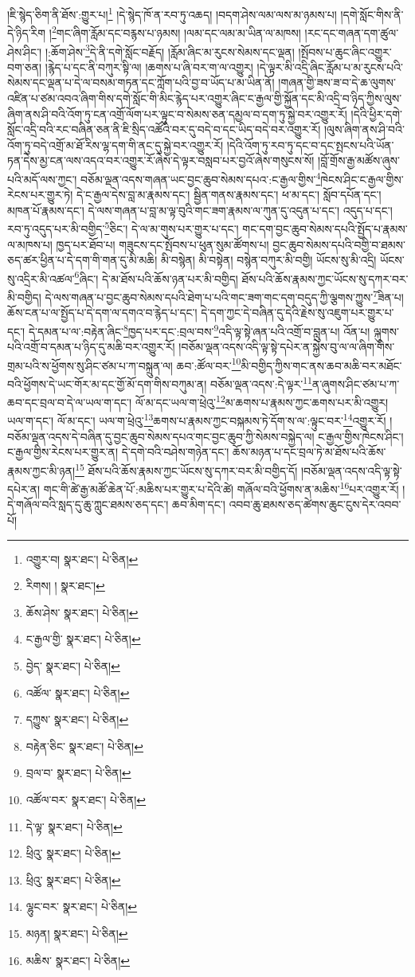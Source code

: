 །ཇི་སྙེད་ཅིག་ནི་ཐོས་:གྱུར་པ།\footnote{འགྱུར་བ།  སྣར་ཐང་།  པེ་ཅིན། } །དེ་སྙེད་ཁོ་ན་རབ་ཏུ་འཆད། །བདག་ཤེས་ལམ་ལས་མ་ཉམས་པ། །དགེ་སློང་གིས་ནི་དེ་ཉིད་རིག །\footnote{རིགས། །  སྣར་ཐང་། }གང་ཞིག་རློམ་དང་བརྙས་པ་ཉམས། །ལམ་དང་ལམ་མ་ཡིན་ལ་མཁས། །རང་དང་གཞན་དག་ཚུལ་ཤེས་ཤིང་། །:ཆོག་ཤེས་\footnote{ཆོས་ཤེས་  སྣར་ཐང་།  པེ་ཅིན། }དེ་ནི་དགེ་སློང་བརྗོད། །རློམ་ཞིང་མ་རུངས་སེམས་དང་ལྡན། །སྤོབས་པ་ཆུང་ཞིང་འགྱུར་བག་ཅན། །རྙེད་པ་དང་ནི་བཀུར་སྟི་ལ། །ཆགས་པ་ཞི་བར་ག་ལ་འགྱུར། །དེ་ལྟར་མི་འདྲི་ཞིང་རློམ་པ་མ་རུངས་པའི་སེམས་དང་ལྡན་པ་དེ་ལ་བསམ་གཏན་དང་ཀློག་པའི་བྱ་བ་ཡོད་པ་མ་ཡིན་ནོ། །གཞན་གྱི་ཟས་ཟ་བ་དེ་ཆ་ལུགས་འཛིན་པ་ཙམ་འབའ་ཞིག་གིས་དགེ་སློང་གི་མིང་རྙེད་པར་འགྱུར་ཞིང་ང་རྒྱལ་གྱི་སྐྱོན་དང་མི་འདྲི་བ་ཉིད་ཀྱིས་ལུས་ཞིག་ནས་ཤི་བའི་འོག་ཏུ་ངན་འགྲོ་ལོག་པར་ལྟུང་བ་སེམས་ཅན་དམྱལ་བ་དག་ཏུ་སྐྱེ་བར་འགྱུར་རོ། །དེའི་ཕྱིར་དགེ་སློང་འདྲི་བའི་རང་བཞིན་ཅན་ནི་ཇི་སྲིད་འཚོའི་བར་དུ་བདེ་བ་དང་ཡིད་བདེ་བར་འགྱུར་རོ། །ལུས་ཞིག་ནས་ཤི་བའི་འོག་ཏུ་བདེ་འགྲོ་མ་ཐོ་རིས་ལྷ་དག་གི་ནང་དུ་སྐྱེ་བར་འགྱུར་རོ། །དེའི་འོག་ཏུ་རབ་ཏུ་དང་བ་དང་སྤངས་པའི་ཡོན་ཏན་དེས་མྱ་ངན་ལས་འདའ་བར་འགྱུར་རོ་ཞེས་དེ་ལྟར་བསླབ་པར་བྱའོ་ཞེས་གསུངས་སོ། །བློ་གྲོས་རྒྱ་མཚོས་ཞུས་པའི་མདོ་ལས་ཀྱང་། བཅོམ་ལྡན་འདས་གཞན་ཡང་བྱང་ཆུབ་སེམས་དཔའ་:ང་རྒྱལ་གྱིས་\footnote{ང་རྒྱལ་གྱི་  སྣར་ཐང་།  པེ་ཅིན། }ཁེངས་ཤིང་ང་རྒྱལ་གྱིས་རེངས་པར་གྱུར་ཏེ། དེ་ང་རྒྱལ་དེས་བླ་མ་རྣམས་དང་། སྦྱིན་གནས་རྣམས་དང་། ཕ་མ་དང་། སློབ་དཔོན་དང་། མཁན་པོ་རྣམས་དང་། དེ་ལས་གཞན་པ་བླ་མ་ལྟ་བུའི་གང་ཟག་རྣམས་ལ་ཀུན་དུ་འདུན་པ་དང་། འདུད་པ་དང་། རབ་ཏུ་འདུད་པར་མི་བགྱིད་\footnote{བྱེད་  སྣར་ཐང་།  པེ་ཅིན། }ཅིང་། དེ་ལ་མ་གུས་པར་གྱུར་པ་དང་། གང་དག་བྱང་ཆུབ་སེམས་དཔའི་སྤྱོད་པ་རྣམས་ལ་མཁས་པ། ཁྱད་པར་ཐོབ་པ། གཟུངས་དང་སྤོབས་པ་ཕུན་སུམ་ཚོགས་པ། བྱང་ཆུབ་སེམས་དཔའི་བགྱི་བ་ཐམས་ཅད་ཚར་ཕྱིན་པ་དེ་དག་གི་གན་དུ་མི་མཆི། མི་བསྙེན། མི་བསྟེན། བསྙེན་བཀུར་མི་བགྱི། ཡོངས་སུ་མི་འདྲི། ཡོངས་སུ་འདྲིར་མི་འཚལ་\footnote{འཚོལ་  སྣར་ཐང་།  པེ་ཅིན། }ཞིང་། དེ་མ་ཐོས་པའི་ཆོས་ཉན་པར་མི་བགྱིད། ཐོས་པའི་ཆོས་རྣམས་ཀྱང་ཡོངས་སུ་དཀར་བར་མི་བགྱིད། དེ་ལས་གཞན་པ་བྱང་ཆུབ་སེམས་དཔའི་ཐེག་པ་པའི་གང་ཟག་གང་དག་བདུད་ཀྱི་ལྕགས་ཀྱུས་\footnote{དཀྱུས་  སྣར་ཐང་།  པེ་ཅིན། }ཟིན་པ། ཆོས་ངན་པ་ལ་སྤྱོད་པ་དེ་དག་ལ་དགའ་བ་རྙེད་པ་དང་། དེ་དག་ཀྱང་དེ་བཞིན་དུ་དེའི་རྗེས་སུ་འཇུག་པར་གྱུར་པ་དང་། དེ་དམན་པ་ལ་:བརྟེན་ཞིང་\footnote{བརྟེན་ཅིང་  སྣར་ཐང་།  པེ་ཅིན། }ཁྱད་པར་དང་:བྲལ་བས་\footnote{བྲལ་བ་  སྣར་ཐང་།  པེ་ཅིན། }འདི་ལྟ་སྟེ་ཞན་པའི་འགྲོ་བ་བླུན་པ། འོན་པ། ལྐུགས་པའི་འགྲོ་བ་དམན་པ་ཉིད་དུ་མཆི་བར་འགྱུར་རོ། །བཅོམ་ལྡན་འདས་འདི་ལྟ་སྟེ་དཔེར་ན་སྐྱེས་བུ་ལ་ལ་ཞིག་གིས་གྲམ་པའི་ས་ཕྱོགས་སུ་ཤིང་ཙམ་པ་ཀ་བསྐྲུན་ལ། ཆབ་:ཚོལ་བར་\footnote{འཚོལ་བར་  སྣར་ཐང་།  པེ་ཅིན། }མི་བགྱིད་ཀྱིས་གང་ནས་ཆབ་མཆི་བར་མཐོང་བའི་ཕྱོགས་དེ་ཡང་གོར་མ་དང་གྱོ་མོ་དག་གིས་བཀུམ་ན། བཅོམ་ལྡན་འདས་:དེ་ལྟར་\footnote{དེ་ལྟ་  སྣར་ཐང་།  པེ་ཅིན། }ན་ཞུགས་ཤིང་ཙམ་པ་ཀ་ཆབ་དང་བྲལ་བ་དེ་ལ་ཡལ་ག་དང་། ལོ་མ་དང་ཡལ་ག་ཕྲེའུ་\footnote{ཕྲིའུ་  སྣར་ཐང་།  པེ་ཅིན། }མ་ཆགས་པ་རྣམས་ཀྱང་ཆགས་པར་མི་འགྱུར། ཡལ་ག་དང་། ལོ་མ་དང་། ཡལ་ག་ཕྲེའུ་\footnote{ཕྲིའུ་  སྣར་ཐང་།  པེ་ཅིན། }ཆགས་པ་རྣམས་ཀྱང་བསྐམས་ཏེ་དོག་ས་ལ་:ལྟུང་བར་\footnote{ལྷུང་བར་  སྣར་ཐང་།  པེ་ཅིན། }འགྱུར་རོ། །བཅོམ་ལྡན་འདས་དེ་བཞིན་དུ་བྱང་ཆུབ་སེམས་དཔའ་གང་བྱང་ཆུབ་ཀྱི་སེམས་བསྐྱེད་ལ། ང་རྒྱལ་གྱིས་ཁེངས་ཤིང་། ང་རྒྱལ་གྱིས་རེངས་པར་གྱུར་ན། དེ་དགེ་བའི་བཤེས་གཉེན་དང་། ཆོས་མཉན་པ་དང་བྲལ་ཏེ་མ་ཐོས་པའི་ཆོས་རྣམས་ཀྱང་མི་ཉན།\footnote{མཉན།  སྣར་ཐང་།  པེ་ཅིན། } ཐོས་པའི་ཆོས་རྣམས་ཀྱང་ཡོངས་སུ་དཀར་བར་མི་བགྱིད་དོ། །བཅོམ་ལྡན་འདས་འདི་ལྟ་སྟེ་དཔེར་ན། གང་གི་ཚེ་རྒྱ་མཚོ་ཆེན་པོ་:མཆིས་པར་གྱུར་པ་དེའི་ཚེ། གཞོལ་བའི་ཕྱོགས་ན་མཆིས་\footnote{མཆིས་  སྣར་ཐང་།  པེ་ཅིན། }པར་འགྱུར་རོ། །དེ་གཞོལ་བའི་སླད་དུ་ཆུ་ཀླུང་ཐམས་ཅད་དང་། ཆབ་མིག་དང་། འབབ་ཆུ་ཐམས་ཅད་ཚེགས་ཆུང་ངུས་དེར་འབབ་པོ། 